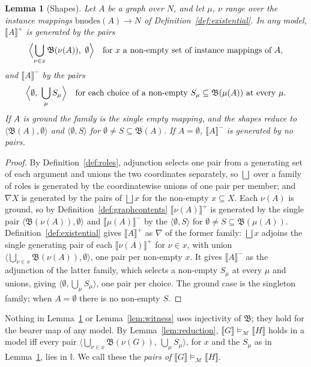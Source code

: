 \documentclass[12pt]{article}
\newcommand{\I}{\mathbb{I}}
\newtheorem{lemma}{Lemma}
\theoremstyle{definition}
\newcommand{\tuple}[1]{\langle #1 \rangle}
\newcommand{\sem}[1]{\llbracket #1 \rrbracket}  %
\newcommand{\bmap}{\mathfrak{B}}  %
\newcommand{\Mcal}{\mathcal{M}}   %
\begin{document}
\begin{lemma}[Shapes]
\label{lem:shapes}
Let $A$ be a graph over $N$, and let $\mu$, $\nu$ range over the instance mappings $\mathrm{bnodes}(A) \rightarrow N$ of Definition~\ref{def:existential}. In any model, $\sem{A}^{+}$ is generated by the pairs
\[
\Bigl\langle \bigcup_{\nu \in x} \bmap(\nu(A)),\ \emptyset \Bigr\rangle \quad \text{for } x \text{ a non-empty set of instance mappings of } A,
\]
and $\sem{A}^{-}$ by the pairs
\[
\Bigl\langle \emptyset,\ \bigcup_{\mu} S_{\mu} \Bigr\rangle \quad \text{for each choice of a non-empty } S_{\mu} \subseteq \bmap(\mu(A)) \text{ at every } \mu.
\]
If $A$ is ground the family is the single empty mapping, and the shapes reduce to $\tuple{\bmap(A), \emptyset}$ and $\tuple{\emptyset, S}$ for $\emptyset \neq S \subseteq \bmap(A)$. If $A = \emptyset$, $\sem{A}^{-}$ is generated by no pairs.
\end{lemma}

\begin{proof}
By Definition~\ref{def:roles}, adjunction selects one pair from a generating set of each argument and unions the two coordinates separately, so $\bigsqcup$ over a family of roles is generated by the coordinatewise unions of one pair per member; and $\nabla X$ is generated by the pairs of $\bigsqcup x$ for the non-empty $x \subseteq X$. Each $\nu(A)$ is ground, so by Definition~\ref{def:graphcontents} $\sem{\nu(A)}^{+}$ is generated by the single pair $\tuple{\bmap(\nu(A)), \emptyset}$ and $\sem{\mu(A)}^{-}$ by the $\tuple{\emptyset, S}$ for $\emptyset \neq S \subseteq \bmap(\mu(A))$. Definition~\ref{def:existential} gives $\sem{A}^{+}$ as $\nabla$ of the former family: $\bigsqcup x$ adjoins the single generating pair of each $\sem{\nu(A)}^{+}$ for $\nu \in x$, with union $\tuple{\bigcup_{\nu \in x} \bmap(\nu(A)), \emptyset}$, one pair per non-empty $x$. It gives $\sem{A}^{-}$ as the adjunction of the latter family, which selects a non-empty $S_{\mu}$ at every $\mu$ and unions, giving $\tuple{\emptyset, \bigcup_{\mu} S_{\mu}}$, one pair per choice. The ground case is the singleton family; when $A = \emptyset$ there is no non-empty $S$.
\end{proof}

Nothing in Lemma~\ref{lem:shapes} or Lemma~\ref{lem:witness} uses injectivity of $\bmap$; they hold for the bearer map of any model. By Lemma~\ref{lem:reduction}, $\sem{G} \models_{\Mcal} \sem{H}$ holds in a model iff every pair $\tuple{\bigcup_{\nu \in x}\bmap(\nu(G)),\ \bigcup_{\mu} S_{\mu}}$, for $x$ and the $S_{\mu}$ as in Lemma~\ref{lem:shapes}, lies in $\I$. We call these the \textit{pairs of} $\sem{G} \models_{\Mcal} \sem{H}$.
\end{document}
